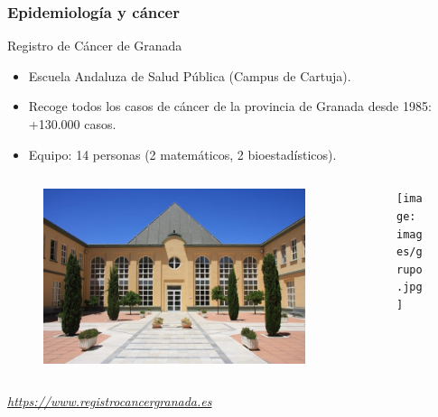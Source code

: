 \documentclass{beamer}
\begin{document}
\begin{frame}\frametitle{Epidemiología y cáncer}
	\begin{block}{Registro de Cáncer de Granada}
		\begin{itemize}
			\item Escuela Andaluza de Salud Pública (Campus de Cartuja).
			\item Recoge todos los casos de cáncer de la provincia de Granada desde 1985: +130.000 casos.
			\item Equipo: 14 personas (2 matemáticos, 2 bioestadísticos).
		\end{itemize}
		
	\vspace{-10pt}	
	\begin{columns}
		\begin{column}{.5\textwidth}
		\begin{figure}
			\centering
			\includegraphics[width=.9\textwidth]{images/registro.jpg}
		\end{figure}
		\end{column}
		\begin{column}{.5\textwidth}
			\begin{figure}
				\centering
			\texttt{[image: images/grupo.jpg]}
			\end{figure}
		\end{column}
	\end{columns}
	
	\vspace{5pt}
	\centering
	\textit{\url{https://www.registrocancergranada.es}}
	\end{block}
\end{frame}

\end{document}
